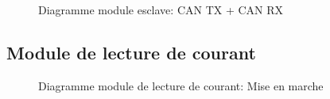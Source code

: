 		\begin{figure}[H]
			\centering
			\caption{Diagramme module esclave: CAN TX + CAN RX}
			\label{fig:diagrammefonctionnelslavecan}
		\end{figure}
		
	\subsection{Module de lecture de courant}

		\begin{figure}[H]
			\centering
			\caption{Diagramme module de lecture de courant: Mise en marche}
			\label{fig:diagrammefonctionnelcurrentmiseenmarche}
		\end{figure}

